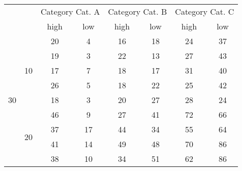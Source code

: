 
\begin{table}[h]
\begin{tabular}{cc|c|c|c|c|c|c|}
\cline{3-8}
                                           &                     & \multicolumn{2}{c|}{Category Cat. A} & \multicolumn{2}{c|}{Category Cat. B} & \multicolumn{2}{c|}{Category Cat. C} \\ \cline{3-8} 
                                           &                     & high            & low           & high            & low           & high            & low           \\ \hline
\multicolumn{1}{|c|}{\multirow{15}{*}{30}} & \multirow{5}{*}{10} & 20              & 4             & 16              & 18            & 24              & 37            \\ \cline{3-8} 
\multicolumn{1}{|c|}{}                     &                     & 19              & 3             & 22              & 13            & 27              & 43            \\ \cline{3-8} 
\multicolumn{1}{|c|}{}                     &                     & 17              & 7             & 18              & 17            & 31              & 40            \\ \cline{3-8} 
\multicolumn{1}{|c|}{}                     &                     & 26              & 5             & 18              & 22            & 25              & 42            \\ \cline{3-8} 
\multicolumn{1}{|c|}{}                     &                     & 18              & 3             & 20              & 27            & 28              & 24            \\ \cline{2-8} 
\multicolumn{1}{|c|}{}                     & \multirow{5}{*}{20} & 46              & 9             & 27              & 41            & 72              & 66            \\ \cline{3-8} 
\multicolumn{1}{|c|}{}                     &                     & 37              & 17            & 44              & 34            & 55              & 64            \\ \cline{3-8} 
\multicolumn{1}{|c|}{}                     &                     & 41              & 14            & 49              & 48            & 70              & 86            \\ \cline{3-8} 
\multicolumn{1}{|c|}{}                     &                     & 38              & 10            & 34              & 51            & 62              & 86            \\ \cline{3-8} 

\end{tabular}
\end{table}
